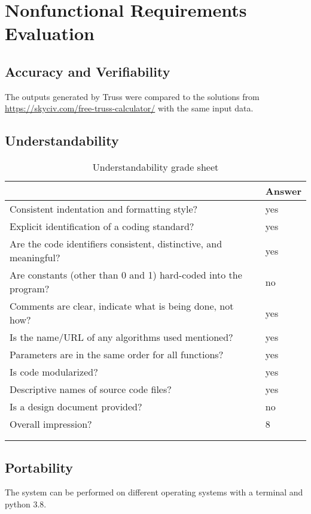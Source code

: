 \documentclass[12pt, titlepage]{article}
\begin{document}
\section{Nonfunctional Requirements Evaluation}

\subsection{Accuracy and Verifiability} \label{accver}
The outputs generated by Truss were compared to the solutions from 
\url{https://skyciv.com/free-truss-calculator/} with the same input data.
\subsection{Understandability} \label{under}
\begin{longtable}{l l}
	\begin{tabular}{l l} 
		\toprule		
		\textbf{Questions} & \textbf{Answer}\\
		\midrule 
		Consistent indentation and formatting style? & yes\\
		Explicit identification of a coding standard? & yes\\
		Are the code identifiers consistent, distinctive, and meaningful? & 
		yes \\
		Are constants (other than 0 and 1) hard-coded into the program? & 
		no \\
		Comments are clear, indicate what is being done, not how? & yes \\
		Is the name/URL of any algorithms used mentioned? & yes \\
		Parameters are in the same order for all functions? & yes\\
		Is code modularized? & yes \\
		Descriptive names of source code files? & yes \\
		Is a design document provided? & no \\
		Overall impression? & 8 \\
		\bottomrule
		\caption{Understandability grade sheet} \label{Undgradesheet} \\
	\end{tabular}\\
\end{longtable}
\subsection{Portability} \label{port}
The system can be performed on different operating systems with a terminal and 
python 3.8.
\end{document}

